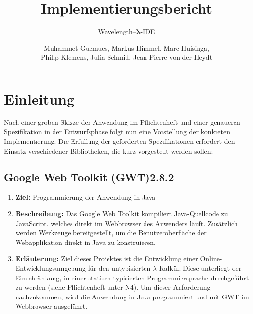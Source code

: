 \documentclass[parskip=full,11pt]{scrartcl}
\title{Implementierungsbericht}
\subtitle{Wavelength--$\bm{\lambda}$-IDE}
\author{Muhammet Guemues, Markus Himmel, Marc Huisinga,\\Philip Klemens, Julia Schmid, Jean-Pierre von der Heydt}
\begin{document}
\maketitle
\newpage
\tableofcontents
\newpage

\section{Einleitung}
Nach einer groben Skizze der Anwendung im Pflichtenheft und einer genaueren Spezifikation in der Entwurfsphase folgt nun eine Vorstellung der konkreten Implementierung.
Die Erfüllung der geforderten Spezifikationen erfordert den Einsatz verschiedener Bibliotheken, die kurz vorgestellt werden sollen:

\subsection{Google Web Toolkit (GWT)2.8.2 }
\begin{enumerate}
\item[] \textbf{Ziel:} Programmierung der Anwendung in Java
\item[] \textbf{Beschreibung:} Das Google Web Toolkit kompiliert Java-Quellcode zu JavaScript, welches direkt im Webbrowser des Anwenders läuft. Zusätzlich
werden Werkzeuge bereitgestellt, um die Benutzeroberfläche der Webapplikation direkt in Java zu konstruieren.
\item[] \textbf{Erläuterung:} Ziel dieses Projektes ist die Entwicklung einer Online-Ent\-wick\-lungs\-um\-ge\-bung für den untypisierten $\lambda$-Kalkül.
Diese unterliegt der Einschränkung, in einer statisch typisierten Programmiersprache durchgeführt zu werden (siehe Pflichtenheft unter N4).
Um dieser Anforderung nachzukommen, wird die Anwendung in Java programmiert und mit GWT im Webbrowser ausgeführt.
\end{enumerate}
\end{document}
